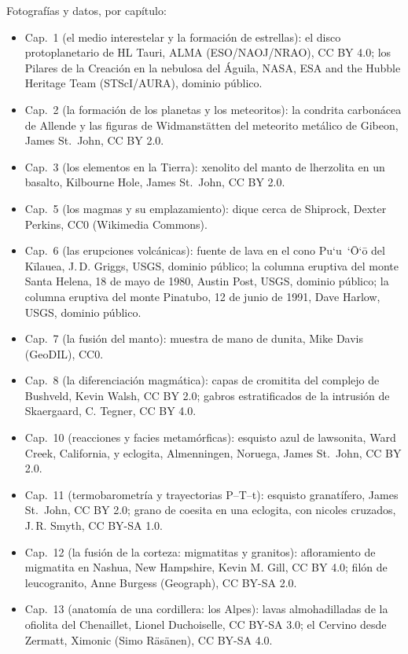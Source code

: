 \bigskip
\noindent Fotografías y datos, por capítulo:
\begin{itemize}\small
  \item Cap.~1 (el medio interestelar y la formación de estrellas): el disco protoplanetario de HL Tauri, ALMA (ESO/NAOJ/NRAO), CC BY 4.0; los Pilares de la Creación en la nebulosa del Águila, NASA, ESA and the Hubble Heritage Team (STScI/AURA), dominio público.
  \item Cap.~2 (la formación de los planetas y los meteoritos): la condrita carbonácea de Allende y las figuras de Widmanstätten del meteorito metálico de Gibeon, James St.~John, CC BY 2.0.
  \item Cap.~3 (los elementos en la Tierra): xenolito del manto de lherzolita en un basalto, Kilbourne Hole, James St.~John, CC BY 2.0.
  \item Cap.~5 (los magmas y su emplazamiento): dique cerca de Shiprock, Dexter Perkins, CC0 (Wikimedia Commons).
  \item Cap.~6 (las erupciones volcánicas): fuente de lava en el cono Pu`u~`\=O`\=o del Kīlauea, J.\,D. Griggs, USGS, dominio público; la columna eruptiva del monte Santa Helena, 18 de mayo de 1980, Austin Post, USGS, dominio público; la columna eruptiva del monte Pinatubo, 12 de junio de 1991, Dave Harlow, USGS, dominio público.
  \item Cap.~7 (la fusión del manto): muestra de mano de dunita, Mike Davis (GeoDIL), CC0.
  \item Cap.~8 (la diferenciación magmática): capas de cromitita del complejo de Bushveld, Kevin Walsh, CC BY 2.0; gabros estratificados de la intrusión de Skaergaard, C. Tegner, CC BY 4.0.
  \item Cap.~10 (reacciones y facies metamórficas): esquisto azul de lawsonita, Ward Creek, California, y eclogita, Almenningen, Noruega, James St.~John, CC BY 2.0.
  \item Cap.~11 (termobarometría y trayectorias P--T--t): esquisto granatífero, James St.~John, CC BY 2.0; grano de coesita en una eclogita, con nicoles cruzados, J.\,R. Smyth, CC BY-SA 1.0.
  \item Cap.~12 (la fusión de la corteza: migmatitas y granitos): afloramiento de migmatita en Nashua, New Hampshire, Kevin M. Gill, CC BY 4.0; filón de leucogranito, Anne Burgess (Geograph), CC BY-SA 2.0.
  \item Cap.~13 (anatomía de una cordillera: los Alpes): lavas almohadilladas de la ofiolita del Chenaillet, Lionel Duchoiselle, CC BY-SA 3.0; el Cervino desde Zermatt, Ximonic (Simo Räsänen), CC BY-SA 4.0.

\end{itemize}

